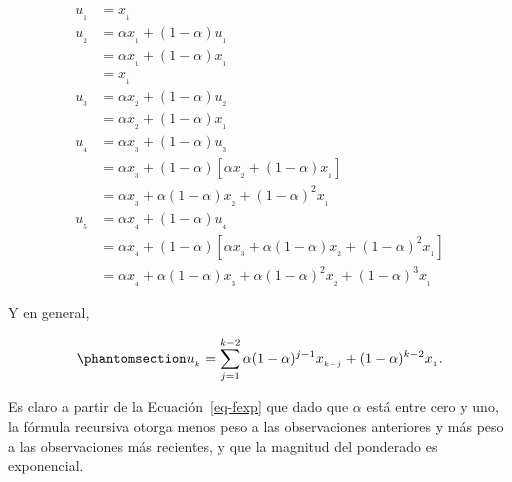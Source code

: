 \documentclass[
  us-letterpaper,
]{scrreprt}
\theoremstyle{plain}
\theoremstyle{definition}
\theoremstyle{plain}
\theoremstyle{definition}
\theoremstyle{remark}
\begin{document}
\[
\begin{split}
u_{_1} &= x_{_1}\\
u_{_2} &= \alpha x_{_1}+(1-\alpha)u_{_1}\\ &=\alpha x_{_1}+(1-\alpha)x_{_1}\\ &=x_{_1}\\
u_{_3} &= \alpha x_{_2}+(1-\alpha)u_{_2}\\ &=\alpha x_{_2}+(1-\alpha)x_{_1}\\
u_{_4} &= \alpha x_{_3}+(1-\alpha)u_{_3}\\ &=\alpha x_{_3}+(1-\alpha)[\alpha x_{_2}+(1-\alpha)x_{_1}]\\ &=\alpha x_{_3} + \alpha(1-\alpha)x_{_2}+(1-\alpha)^2x_{_1}\\
u_{_5} &= \alpha x_{_4}+(1-\alpha)u_{_4}\\ &=\alpha x_{_4}+(1-\alpha)[\alpha x_{_3}+\alpha(1-\alpha)x_{_2}+(1-\alpha)^2x_{_1}]\\ &=\alpha x_{_4} + \alpha(1-\alpha)x_{_3}+\alpha(1-\alpha)^2 x_{_2}+(1-\alpha)^3x_{_1}
\end{split}
\]

Y en general,

\begin{equation}\phantomsection\label{eq-fexp}{
u_{_k}=\sum_{j=1}^{k-2}\alpha(1-\alpha)^{j-1}x_{_{k-j}}+(1-\alpha)^{k-2}x_{_1}.
}\end{equation}

Es claro a partir de la Ecuación~\ref{eq-fexp} que dado que \(\alpha\)
está entre cero y uno, la fórmula recursiva otorga menos peso a las
observaciones anteriores y más peso a las observaciones más recientes, y
que la magnitud del ponderado es exponencial.
\end{document}
